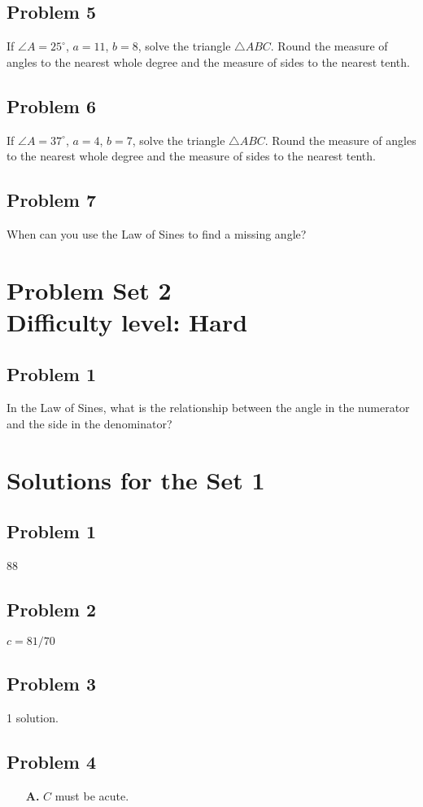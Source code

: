 \documentclass[12pt]{article}
\begin{document}
\subsection*{Problem 5}
If \(\angle A = 25^\circ\), \(a = 11\), \(b = 8\), solve the triangle \(\triangle ABC\). Round the measure of angles to the nearest whole degree and the measure of sides to the nearest tenth.

\subsection*{Problem 6}
If \(\angle A = 37^\circ\), \(a = 4\), \(b = 7\), solve the triangle \(\triangle ABC\). Round the measure of angles to the nearest whole degree and the measure of sides to the nearest tenth.

\subsection*{Problem 7}
When can you use the Law of Sines to find a missing angle?

\section*{Problem Set 2\\Difficulty level: Hard}
\subsection*{Problem 1}
In the Law of Sines, what is the relationship between the angle in the numerator and the side in the denominator?

\newpage
\section*{Solutions for the Set 1}
\subsection*{Problem 1}
88
\subsection*{Problem 2}
\(c=81/70\)
\subsection*{Problem 3}
1 solution.
\subsection*{Problem 4}
\begin{enumerate}
    \item[\textbf{A.}] \(C\) must be acute.
\end{enumerate}
\end{document}
